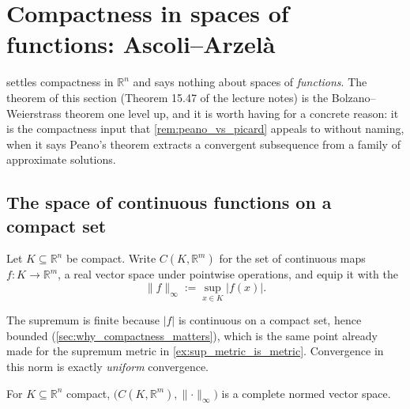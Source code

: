 
\section{Compactness in spaces of functions: Ascoli--Arzelà}
\label{sec:ascoli_arzela}

 settles compactness in $\mathbb{R}^n$ and says nothing about spaces of
\emph{functions}. The theorem of this section (Theorem 15.47 of the lecture notes) is the
Bolzano--Weierstrass theorem one level up, and it is worth having for a concrete reason: it is the
compactness input that \cref{rem:peano_vs_picard} appeals to without naming, when it says Peano's
theorem extracts a convergent subsequence from a family of approximate solutions.

\subsection{The space of continuous functions on a compact set}

\begin{definition}
\label{def:sup_norm_function_space}
Let $K \subseteq \mathbb{R}^n$ be compact. Write $C(K,\mathbb{R}^m)$ for the set of continuous
maps $f : K \to \mathbb{R}^m$, a real vector space under pointwise operations, and equip it with
the  
\[\lVert f\rVert_\infty := \sup_{x \in K} \lvert f(x)\rvert.\]
\end{definition}

The supremum is finite because $\lvert f\rvert$ is continuous on a compact set, hence bounded
(\cref{sec:why_compactness_matters}), which is the same point already made for the supremum metric
in \cref{ex:sup_metric_is_metric}. Convergence in this norm is exactly \emph{uniform} convergence.

\begin{proposition}
\label{prop:function_space_complete}
For $K \subseteq \mathbb{R}^n$ compact, $\big(C(K,\mathbb{R}^m), \lVert\cdot\rVert_\infty\big)$
is a complete normed vector space.
\end{proposition}

